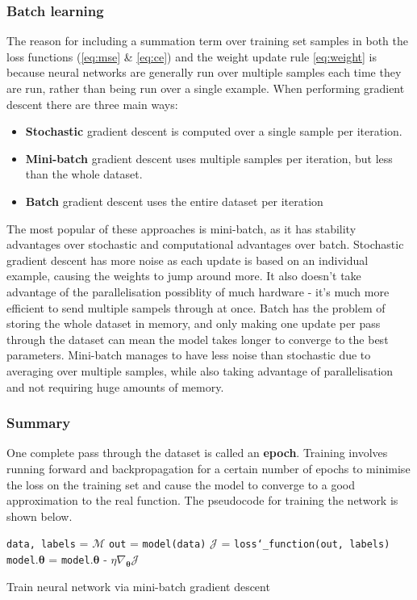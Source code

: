 \documentclass[12pt,a4paper,twoside,openright]{report}
\renewcommand{\vec}[1]{\bm{#1}}
\begin{document}
\subsubsection{Batch learning}

The reason for including a summation term over training set samples in both the loss functions (\eqref{eq:mse} \& \eqref{eq:ce}) and the weight update rule \eqref{eq:weight}
is because neural networks are generally run over multiple samples each time they are run, rather than being run over a single example. When performing gradient descent there
are three main ways:
\begin{itemize}
  \item \textbf{Stochastic} gradient descent is computed over a single sample per iteration.
  \item \textbf{Mini-batch} gradient descent uses multiple samples per iteration, but less than the whole dataset.
  \item \textbf{Batch} gradient descent uses the entire dataset per iteration
\end{itemize}

The most popular of these approaches is mini-batch, as it has stability advantages over stochastic and computational advantages over batch. Stochastic gradient
descent has more noise as each update is based on an individual example, causing the weights to jump around more. It also doesn't take advantage of the 
parallelisation possiblity of much hardware - it's much more efficient to send multiple sampels through at once. Batch has the problem of storing the whole 
dataset in memory, and only making one update per pass through the dataset can mean the model takes longer to converge to the best parameters. Mini-batch manages to
have less noise than stochastic due to averaging over multiple samples, while also taking advantage of parallelisation and not requiring huge amounts of memory.

\subsubsection{Summary}

One complete pass through the dataset is called an \textbf{epoch}. Training involves running forward and backpropagation for a certain number of epochs to minimise the loss
on the training set and cause the model to converge to a good approximation to the real function. The pseudocode for training the network is shown below.
\begin{algorithm}
  \begin{algorithmic}[1]
    \State \texttt{data, labels} = $\mathcal{M}$
    \State \texttt{out} = \texttt{model(data)}
    \State $\mathcal{J}$ = \texttt{loss\char`_function(out, labels)}
    \State \texttt{model}.$\vec{\theta}$ = \texttt{model}.$\vec{\theta}$ - $\eta \nabla_{\vec{\theta}} \mathcal{J}$ 
    \EndFor
    \EndFor
    \EndProcedure
  \end{algorithmic}
  \caption{Train neural network via mini-batch gradient descent} 
  \label{alg:train}
\end{algorithm}
\end{document}
